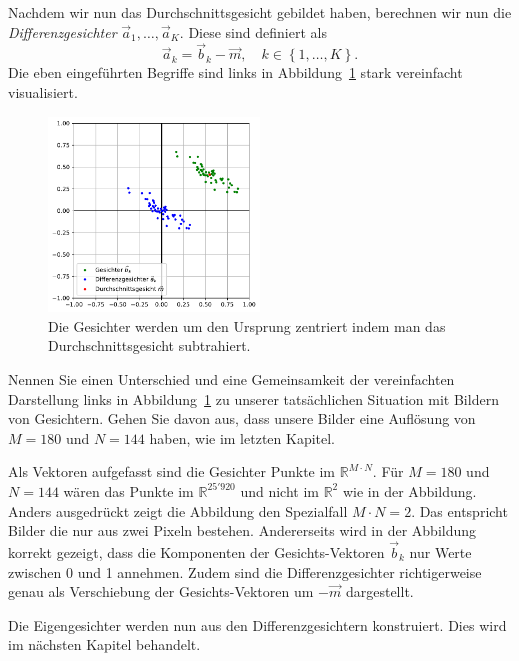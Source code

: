 Nachdem wir nun das Durchschnittsgesicht gebildet haben, berechnen wir nun die \textit{Differenzgesichter} $\vec a_1,\ldots,\vec a_K$.
Diese sind definiert als
\begin{equation*}
	\vec a_k=\vec b_k-\vec m,\quad k\in\left\{1,\ldots,K\right\}.
\end{equation*}
Die eben eingeführten Begriffe sind links in Abbildung~\ref{fig:meandiff} stark vereinfacht visualisiert.
\begin{figure}[ht]
	\centering
	\includegraphics[width=0.5\textwidth]{images/facespace/meandiff}
	\caption{Die Gesichter werden um den Ursprung zentriert indem man das Durchschnittsgesicht subtrahiert.}
	\label{fig:meandiff}
\end{figure}
\begin{aufgabe} \label{aufg:hmmc}
	Nennen Sie einen Unterschied und eine Gemeinsamkeit der vereinfachten Darstellung links in Abbildung~\ref{fig:meandiff} zu unserer tatsächlichen Situation mit Bildern von Gesichtern.
	Gehen Sie davon aus, dass unsere Bilder eine Auflösung von $M=180$ und $N=144$ haben, wie im letzten Kapitel.
\end{aufgabe}
\begin{losung*}
	Als Vektoren aufgefasst sind die Gesichter Punkte im $\mathbb R^{M\cdot N}$.
	Für $M=180$ und $N=144$ wären das Punkte im $\mathbb R^{25'920}$ und nicht im $\mathbb R^2$ wie in der Abbildung.
	Anders ausgedrückt zeigt die Abbildung den Spezialfall $M\cdot N=2$.
	Das entspricht Bilder die nur aus zwei Pixeln bestehen.
	Andererseits wird in der Abbildung korrekt gezeigt, dass die Komponenten der Gesichts-Vektoren $\vec b_k$ nur Werte zwischen 0 und 1 annehmen.
	Zudem sind die Differenzgesichter richtigerweise genau als Verschiebung der Gesichts-Vektoren um $-\vec m$ dargestellt.
\end{losung*}
Die Eigengesichter werden nun aus den Differenzgesichtern konstruiert.
Dies wird im nächsten Kapitel behandelt.